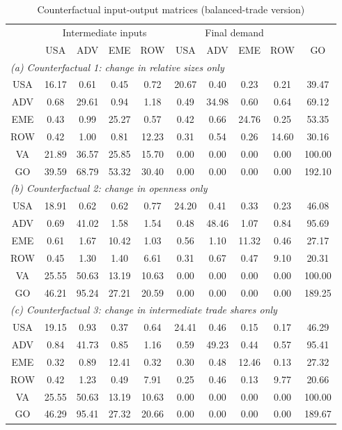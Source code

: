 \begin{table}[p]
\begin{center}
\caption{Counterfactual input-output matrices (balanced-trade version)}
\label{tab:iomat-counter}
\small
\begin{tabular}{cccccccccc}
\toprule
& \multicolumn{4}{c}{Intermediate inputs}& \multicolumn{4}{c}{Final demand} & \\
\cmidrule(rl){2-5}\cmidrule(rl){6-9}
 &USA &ADV &EME &ROW &USA &ADV &EME &ROW& GO\\
\midrule
\multicolumn{10}{l}{\textit{(a) Counterfactual 1: change in relative sizes only}}\\
USA& 16.17& 0.61& 0.45& 0.72& 20.67& 0.40& 0.23& 0.21& 39.47 \\
ADV& 0.68& 29.61& 0.94& 1.18& 0.49& 34.98& 0.60& 0.64& 69.12 \\
EME& 0.43& 0.99& 25.27& 0.57& 0.42& 0.66& 24.76& 0.25& 53.35 \\
ROW& 0.42& 1.00& 0.81& 12.23& 0.31& 0.54& 0.26& 14.60& 30.16 \\
VA& 21.89& 36.57& 25.85& 15.70& 0.00& 0.00& 0.00& 0.00& 100.00\\
GO& 39.59& 68.79& 53.32& 30.40& 0.00& 0.00& 0.00& 0.00& 192.10\\
\midrule
\multicolumn{10}{l}{\textit{(b) Counterfactual 2: change in openness only}}\\
USA& 18.91& 0.62& 0.62& 0.77& 24.20& 0.41& 0.33& 0.23& 46.08 \\
ADV& 0.69& 41.02& 1.58& 1.54& 0.48& 48.46& 1.07& 0.84& 95.69 \\
EME& 0.61& 1.67& 10.42& 1.03& 0.56& 1.10& 11.32& 0.46& 27.17 \\
ROW& 0.45& 1.30& 1.40& 6.61& 0.31& 0.67& 0.47& 9.10& 20.31 \\
VA& 25.55& 50.63& 13.19& 10.63& 0.00& 0.00& 0.00& 0.00& 100.00\\
GO& 46.21& 95.24& 27.21& 20.59& 0.00& 0.00& 0.00& 0.00& 189.25\\
\midrule
\multicolumn{10}{l}{\textit{(c) Counterfactual 3: change in intermediate trade shares only}}\\
USA& 19.15& 0.93& 0.37& 0.64& 24.41& 0.46& 0.15& 0.17& 46.29 \\
ADV& 0.84& 41.73& 0.85& 1.16& 0.59& 49.23& 0.44& 0.57& 95.41 \\
EME& 0.32& 0.89& 12.41& 0.32& 0.30& 0.48& 12.46& 0.13& 27.32 \\
ROW& 0.42& 1.23& 0.49& 7.91& 0.25& 0.46& 0.13& 9.77& 20.66 \\
VA& 25.55& 50.63& 13.19& 10.63& 0.00& 0.00& 0.00& 0.00& 100.00\\
GO& 46.29& 95.41& 27.32& 20.66& 0.00& 0.00& 0.00& 0.00& 189.67\\
\bottomrule
\end{tabular}
\normalsize
\end{center}
\end{table}
